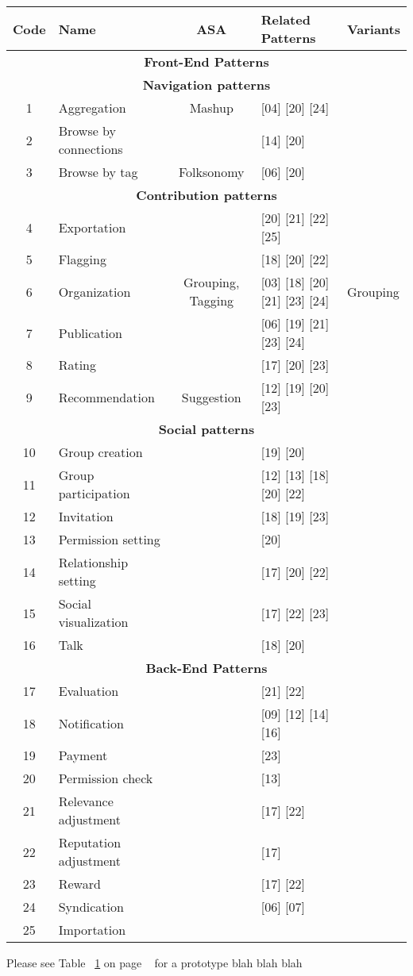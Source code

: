 \documentclass[a4paper]{memoir}
\begin{document}
\begin{table}[htbp]
\caption{}
\begin{tabular}{|c|l|c|l|l|}
\hline
\textbf{Code} & \textbf{Name} & \textbf{ASA} & \textbf{Related Patterns} & \textbf{Variants} \\ \hline
\multicolumn{ 5}{|c|}{\textbf{Front-End Patterns}} \\ \hline
\multicolumn{ 5}{|c|}{\textbf{Navigation patterns}} \\ \hline
1 & Aggregation & Mashup & [04] [20] [24] &  \\ \hline
2 & Browse by connections &  & [14] [20] &  \\ \hline
3 & Browse by tag & Folksonomy & [06] [20] &  \\ \hline
\multicolumn{ 5}{|c|}{\textbf{Contribution patterns}} \\ \hline
4 & Exportation &  & [20] [21] [22] [25] &  \\ \hline
5 & Flagging &  & [18] [20] [22] &  \\ \hline
6 & Organization & Grouping, Tagging & [03] [18] [20] [21] [23] [24] & Grouping \\ \hline
7 & Publication &  & [06] [19] [21] [23] [24] &  \\ \hline
8 & Rating &  & [17] [20] [23] &  \\ \hline
9 & Recommendation & Suggestion & [12] [19] [20] [23] &  \\ \hline
\multicolumn{ 5}{|c|}{\textbf{Social patterns}} \\ \hline
10 & Group creation &  & [19] [20] &  \\ \hline
11 & Group participation &  & [12] [13] [18] [20] [22] &  \\ \hline
12 & Invitation &  & [18] [19] [23] &  \\ \hline
13 & Permission setting &  & [20] &  \\ \hline
14 & Relationship setting &  & [17] [20] [22] &  \\ \hline
15 & Social visualization &  & [17] [22] [23] &  \\ \hline
16 & Talk &  & [18] [20] &  \\ \hline
\multicolumn{ 5}{|c|}{\textbf{Back-End Patterns}} \\ \hline
17 & Evaluation &  & [21] [22] &  \\ \hline
18 & Notification &  & [09] [12] [14] [16] &  \\ \hline
19 & Payment &  & [23] &  \\ \hline
20 & Permission check &  & [13] &  \\ \hline
21 & Relevance adjustment &  & [17] [22] &  \\ \hline
22 & Reputation adjustment &  & [17] &  \\ \hline
23 & Reward &  & [17] [22] &  \\ \hline
24 & Syndication &  & [06] [07] &  \\ \hline
25 & Importation &  &  &  \\ \hline
\end{tabular}
\label{patterns}
\end{table}

Please see Table ~\ref{patterns} on page ~\pageref{patterns} for a prototype blah blah blah



\backmatter
\pagestyle{plain}



\end{document}
